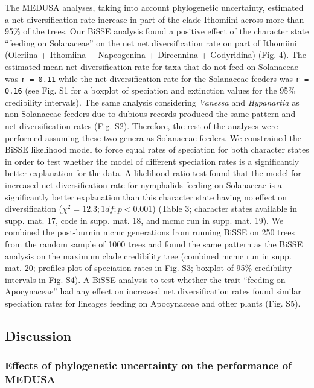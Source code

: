 \documentclass[10pt]{article}
\begin{document}
The MEDUSA analyses, taking into account phylogenetic uncertainty,
estimated a net diversification rate increase in part of the clade
Ithomiini across more than 95\% of the trees. Our BiSSE analysis found a
positive effect of the character state ``feeding on Solanaceae'' on the
net net diversification rate on part of Ithomiini (Oleriina + Ithomiina
+ Napeogenina + Dircennina + Godyridina) (Fig. 4). The estimated mean
net diversification rate for taxa that do not feed on Solanaceae was
\texttt{r = 0.11} while the net diversification rate for the Solanaceae
feeders was \texttt{r = 0.16} (see Fig. S1 for a boxplot of speciation
and extinction values for the 95\% credibility intervals). The same
analysis considering \emph{Vanessa} and \emph{Hypanartia} as
non-Solanaceae feeders due to dubious records produced the same pattern
and net diversification rates (Fig. S2). Therefore, the rest of the
analyses were performed assuming these two genera as Solanaceae feeders.
We constrained the BiSSE likelihood model to force equal rates of
speciation for both character states in order to test whether the model
of different speciation rates is a significantly better explanation for
the data. A likelihood ratio test found that the model for increased net
diversification rate for nymphalids feeding on Solanaceae is a
significantly better explanation than this character state having no
effect on diversification (\(\chi^2 = 12.3; 1 df; p < 0.001\)) (Table 3;
character states available in supp. mat. 17, code in supp. mat. 18, and
mcmc run in supp. mat. 19). We combined the post-burnin mcmc generations
from running BiSSE on 250 trees from the random sample of 1000 trees and
found the same pattern as the BiSSE analysis on the maximum clade
credibility tree (combined mcmc run in supp. mat. 20; profiles plot of
speciation rates in Fig. S3; boxplot of 95\% credibility intervals in
Fig. S4). A BiSSE analysis to test whether the trait ``feeding on
Apocynaceae'' had any effect on increased net diversification rates
found similar speciation rates for lineages feeding on Apocynaceae and
other plants (Fig. S5).

\subsection*{Discussion}

\subsubsection*{Effects of phylogenetic uncertainty on the performance of
MEDUSA}
\end{document}
